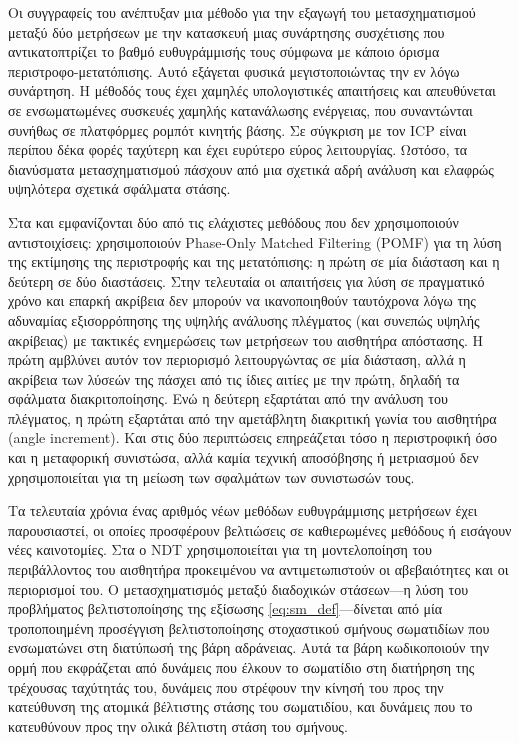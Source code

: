 Οι συγγραφείς του \cite{Konecny2016} ανέπτυξαν μια μέθοδο για την εξαγωγή του
μετασχηματισμού μεταξύ δύο μετρήσεων με την κατασκευή μιας συνάρτησης
συσχέτισης που αντικατοπτρίζει το βαθμό ευθυγράμμισής τους σύμφωνα με κάποιο
όρισμα περιστροφο-μετατόπισης. Αυτό εξάγεται φυσικά μεγιστοποιώντας την εν λόγω
συνάρτηση. Η μέθοδός τους έχει χαμηλές υπολογιστικές απαιτήσεις και απευθύνεται
σε ενσωματωμένες συσκευές χαμηλής κατανάλωσης ενέργειας, που συναντώνται συνήθως
σε πλατφόρμες ρομπότ κινητής βάσης.  Σε σύγκριση με τον ICP είναι περίπου δέκα
φορές ταχύτερη και έχει ευρύτερο εύρος λειτουργίας. Ωστόσο, τα διανύσματα
μετασχηματισμού πάσχουν από μια σχετικά αδρή ανάλυση και ελαφρώς υψηλότερα
σχετικά σφάλματα στάσης.

Στα \cite{Yu2018a} και \cite{Jiang2018a} εμφανίζονται δύο από τις ελάχιστες
μεθόδους που δεν χρησιμοποιούν αντιστοιχίσεις: χρησιμοποιούν Phase-Only Matched
Filtering (POMF) \cite{Qin-ShengChen1994a} για τη λύση της εκτίμησης της
περιστροφής και της μετατόπισης: η πρώτη σε μία διάσταση και η δεύτερη σε δύο
διαστάσεις. Στην τελευταία οι απαιτήσεις για λύση σε πραγματικό χρόνο και
επαρκή ακρίβεια δεν μπορούν να ικανοποιηθούν ταυτόχρονα λόγω της αδυναμίας
εξισορρόπησης της υψηλής ανάλυσης πλέγματος (και συνεπώς υψηλής ακρίβειας) με
τακτικές ενημερώσεις των μετρήσεων του αισθητήρα απόστασης. Η πρώτη αμβλύνει
αυτόν τον περιορισμό λειτουργώντας σε μία διάσταση, αλλά η ακρίβεια των λύσεών
της πάσχει από τις ίδιες αιτίες με την πρώτη, δηλαδή τα σφάλματα
διακριτοποίησης. Ενώ η δεύτερη εξαρτάται από την ανάλυση του πλέγματος, η πρώτη
εξαρτάται από την αμετάβλητη διακριτική γωνία του αισθητήρα (angle increment).
Και στις δύο περιπτώσεις επηρεάζεται τόσο η περιστροφική όσο και η μεταφορική
συνιστώσα, αλλά καμία τεχνική αποσόβησης ή μετριασμού δεν χρησιμοποιείται για
τη μείωση των σφαλμάτων των συνιστωσών τους.

Τα τελευταία χρόνια ένας αριθμός νέων μεθόδων ευθυγράμμισης μετρήσεων έχει
παρουσιαστεί, οι οποίες προσφέρουν βελτιώσεις σε καθιερωμένες μεθόδους ή
εισάγουν νέες καινοτομίες. Στα  \cite{Bouraine2020a,Bouraine2021} ο NDT
χρησιμοποιείται για τη μοντελοποίηση του περιβάλλοντος του αισθητήρα
προκειμένου να αντιμετωπιστούν οι αβεβαιότητες και οι περιορισμοί του. Ο
μετασχηματισμός μεταξύ διαδοχικών στάσεων---η λύση του προβλήματος
βελτιστοποίησης της εξίσωσης \ref{eq:sm_def}---δίνεται από μία τροποποιημένη
προσέγγιση βελτιστοποίησης στοχαστικού σμήνους σωματιδίων που ενσωματώνει στη
διατύπωσή της βάρη αδράνειας. Αυτά τα βάρη κωδικοποιούν την ορμή που εκφράζεται
από δυνάμεις που έλκουν το σωματίδιο στη διατήρηση της τρέχουσας ταχύτητάς του,
δυνάμεις που στρέφουν την κίνησή του προς την κατεύθυνση της ατομικά βέλτιστης
στάσης του σωματιδίου, και δυνάμεις που το κατευθύνουν προς την ολικά βέλτιστη
στάση του σμήνους.

